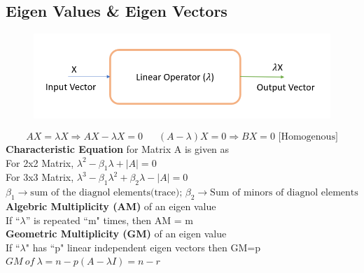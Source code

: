 \subsection{Eigen Values \& Eigen Vectors}
\begin{figure}[h!]
    \centering
    \includegraphics[scale=0.6]{images/eigen-value-vector.png}
\end{figure}
\[AX=\lambda X \Rightarrow AX-\lambda X=0\ \ \ \ \ \ \ (A-\lambda)X=0 \Rightarrow BX=0 \text{ [Homogenous]}\]
\textbf{Characteristic Equation} for Matrix A is given as\\
For 2x2 Matrix, \(\lambda^2-\beta_1\lambda+|A|=0\)\\
For 3x3 Matrix, \(\lambda^3-\beta_1\lambda^2+\beta_2\lambda-|A|=0\)\\
\(\beta_1\rightarrow\text{sum of the diagnol elements(trace); } \beta_2\rightarrow\text{Sum of minors of diagnol elements}\)\vspace{0.2cm}\\
\textbf{Algebric Multiplicity (AM)} of an eigen value\\
If ``\(\lambda\)'' is repeated ``m" times, then AM = m\vspace{0.2cm}\\
\textbf{Geometric Multiplicity (GM)} of an eigen value\\
If ``\(\lambda\)" has ``p" linear independent eigen vectors then GM=p\\
\(GM\ of\ \lambda = n-p(A-\lambda I)=n-r\)
